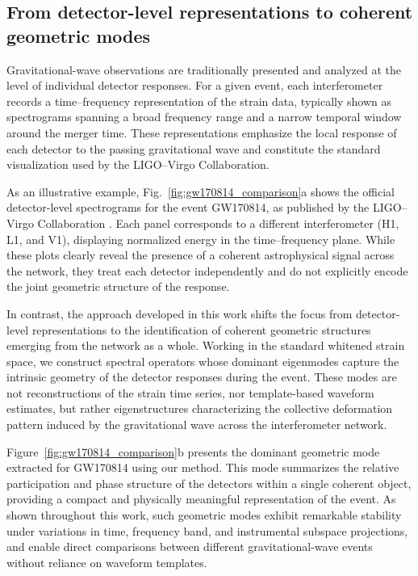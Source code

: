 \documentclass[11pt,a4paper]{article}
\begin{document}
\subsection{From detector-level representations to coherent geometric modes}

Gravitational-wave observations are traditionally presented and analyzed at the level of individual detector responses. For a given event, each interferometer records a time--frequency representation of the strain data, typically shown as spectrograms spanning a broad frequency range and a narrow temporal window around the merger time. These representations emphasize the local response of each detector to the passing gravitational wave and constitute the standard visualization used by the LIGO--Virgo Collaboration.

As an illustrative example, Fig.~\ref{fig:gw170814_comparison}a shows the official detector-level spectrograms for the event GW170814, as published by the LIGO--Virgo Collaboration \cite{Abbott2017GW170814}. Each panel corresponds to a different interferometer (H1, L1, and V1), displaying normalized energy in the time--frequency plane. While these plots clearly reveal the presence of a coherent astrophysical signal across the network, they treat each detector independently and do not explicitly encode the joint geometric structure of the response.

In contrast, the approach developed in this work shifts the focus from detector-level representations to the identification of coherent geometric structures emerging from the network as a whole. Working in the standard whitened strain space, we construct spectral operators whose dominant eigenmodes capture the intrinsic geometry of the detector responses during the event. These modes are not reconstructions of the strain time series, nor template-based waveform estimates, but rather eigenstructures characterizing the collective deformation pattern induced by the gravitational wave across the interferometer network.

Figure~\ref{fig:gw170814_comparison}b presents the dominant geometric mode extracted for GW170814 using our method. This mode summarizes the relative participation and phase structure of the detectors within a single coherent object, providing a compact and physically meaningful representation of the event. As shown throughout this work, such geometric modes exhibit remarkable stability under variations in time, frequency band, and instrumental subspace projections, and enable direct comparisons between different gravitational-wave events without reliance on waveform templates.
\end{document}

